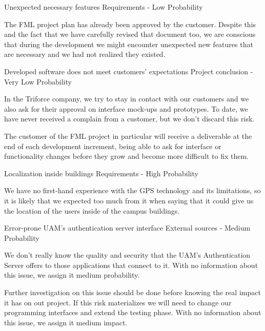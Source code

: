 \begin{risk}{Unexpected necessary features}
\riskcat Requirements
 - Low Probability 

The FML project plan has already been approved by the customer. Despite this and the fact that we have carefully revised that document too, we are conscious that during the development we might encounter unexpected new features that are necessary and we had not realized they existed.
\end{risk}

\begin{risk}{Developed software does not meet customers' expectations}
\riskcat Project conclusion
 - Very Low Probability 

In the Triforce company, we try to stay in contact with our customers and we also ask for their approval on interface mock-ups and prototypes. To date, we have never received a complain from a customer, but we don't discard this risk.

The customer of the FML project in particular will receive a deliverable at the end of each development increment, being able to ask for interface or functionality changes before they grow and become more difficult to fix them.
\end{risk}

\begin{risk}{Localization inside buildings}
\riskcat Requirements
 - High Probability 

We have no first-hand experience with the GPS technology and its limitations, so it is likely that we expected too much from it when saying that it could give us the location of the users inside of the campus buildings.
\end{risk}

\begin{risk}{Error-prone UAM's authentication server interface}
\riskcat External sources
 - Medium Probability 

We don't really know the quality and security that the UAM's Authentication Server offers to those applications that connect to it. With no information about this issue, we assign it medium probability.

Further investigation on this issue should be done before knowing the real impact it has on out project. If this risk materializes we will need to change our programming interfaces and extend the testing phase. With no information about this issue, we assign it medium impact.
\end{risk}

